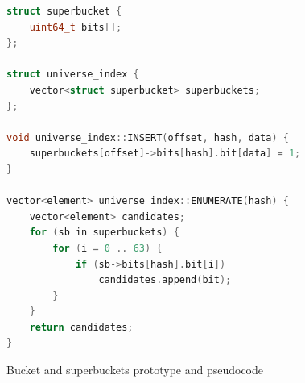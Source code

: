 \begin{figure}[h!]
\begin{tcolorbox}
\begin{lstlisting}[language=c++,tabsize=2]
struct superbucket {
	uint64_t bits[];
};

struct universe_index {
	vector<struct superbucket> superbuckets;
};

void universe_index::INSERT(offset, hash, data) {
	superbuckets[offset]->bits[hash].bit[data] = 1;
}

vector<element> universe_index::ENUMERATE(hash) {
	vector<element> candidates;
	for (sb in superbuckets) {
		for (i = 0 .. 63) {
			if (sb->bits[hash].bit[i]) 
				candidates.append(bit);
		}
	}
	return candidates;
}
\end{lstlisting}
\end{tcolorbox}
\caption{Bucket and superbuckets prototype and pseudocode}
	\label{figure-bucketshop-pseudocode}
\end{figure}



